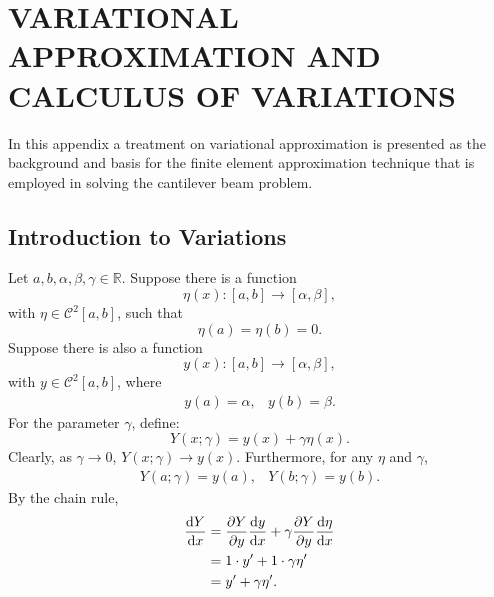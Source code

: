 \appendices
%
%

\chapter{VARIATIONAL APPROXIMATION AND CALCULUS OF VARIATIONS}
\label{app:variations}
In this appendix a treatment on variational approximation is presented as the background and basis for the finite element approximation technique that is employed in solving the cantilever beam problem.

\section{Introduction to Variations}
Let $a,b,\alpha,\beta,\gamma\in\mathbb R$. Suppose there is a function 
\begin{equation}
\eta(x):[a,b]\rightarrow[\alpha,\beta],
\end{equation}
with $\eta\in\mathcal C^2[a,b]$, such that
\begin{equation}
\eta(a) = \eta(b) = 0.
\end{equation}
Suppose there is also a function
\begin{equation}
y(x):[a,b]\rightarrow[\alpha,\beta],
\end{equation}
with $y\in\mathcal C^2[a,b]$, where
\begin{equation}
\begin{array}{rl}
y(a) = \alpha,&y(b) = \beta.
\end{array}
\end{equation}
For the parameter $\gamma$, define:
\begin{equation}
Y(x;\gamma) = y(x)+\gamma\eta(x).
\end{equation}
Clearly, as $\gamma\rightarrow 0$, $Y(x;\gamma)\rightarrow y(x)$. Furthermore, for any $\eta$ and $\gamma$,
\begin{equation}
\begin{array}{rl}
Y(a;\gamma) = y(a),&Y(b;\gamma) = y(b).
\end{array}
\end{equation}
By the chain rule,
\begin{align}
\frac{\text dY}{\text dx} &= \frac{\partial Y}{\partial y}\frac{\text dy}{\text dx}+\gamma\frac{\partial Y}{\partial y}\frac{\text d\eta}{\text dx}\\
						  &= 1\cdot y'+1\cdot \gamma\eta'\\
						  &= y'+\gamma\eta'.
\end{align}
